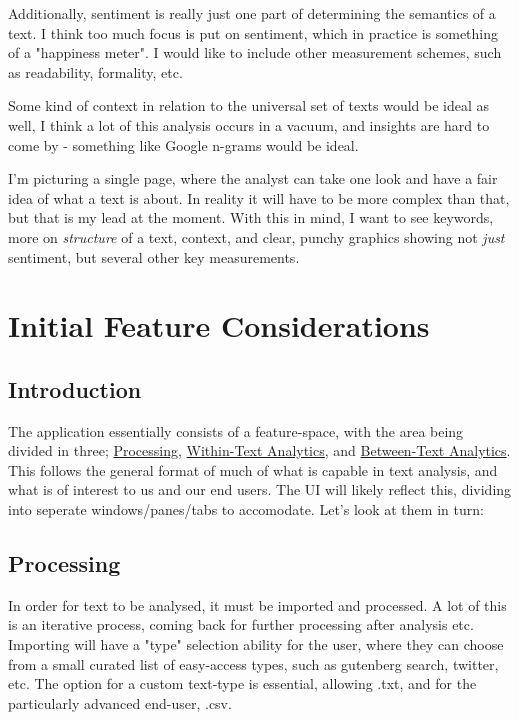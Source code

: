 \documentclass[a4paper, 11pt]{article}
\begin{document}
Additionally, sentiment is really just one part of determining the
semantics of a text. I think too much focus is put on sentiment, which
in practice is something of a "happiness meter". I would like to include
other measurement schemes, such as readability, formality, etc.

Some kind of context in relation to the universal set of texts would be
ideal as well, I think a lot of this analysis occurs in a vacuum, and
insights are hard to come by - something like Google n-grams would be
ideal.

I'm picturing a single page, where the analyst can take one look and
have a fair idea of what a text is about. In reality it will have to be
more complex than that, but that is my lead at the moment. With this in
mind, I want to see keywords, more on \emph{structure} of a text, context,
and clear, punchy graphics showing not \emph{just} sentiment, but several
other key measurements.

\section{Initial Feature Considerations}
\label{sec:org8490800}
\subsection{Introduction}
\label{sec:org8f9245f}
The application essentially consists of a feature-space, with the area
being divided in three; \hyperref[sec:orgdf2cd7a]{Processing}, \hyperref[sec:org01e6c54]{Within-Text Analytics}, and
\hyperref[sec:orgd88538a]{Between-Text Analytics}. This follows the general format of much of
what is capable in text analysis, and what is of interest to us and our
end users. The UI will likely reflect this, dividing into seperate
windows/panes/tabs to accomodate. Let's look at them in turn:
\subsection{Processing}
\label{sec:orgdf2cd7a}
In order for text to be analysed, it must be imported and processed. A
lot of this is an iterative process, coming back for further processing
after analysis etc. Importing will have a "type" selection ability for
the user, where they can choose from a small curated list of easy-access
types, such as gutenberg search, twitter, etc. The option for a custom
text-type is essential, allowing .txt, and for the particularly advanced
end-user, .csv.
\end{document}
